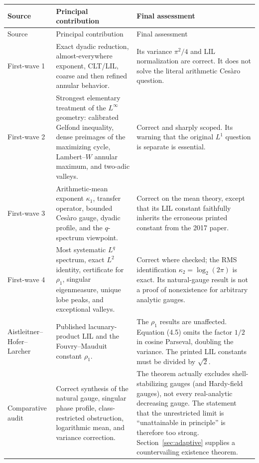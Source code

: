\documentclass[11pt]{article}
\theoremstyle{definition}
\theoremstyle{remark}
\begin{document}
\begin{longtable}{@{}p{}p{}p{}@{}}
\toprule
Source & Principal contribution & Final assessment \\
\midrule
\endfirsthead
\toprule
Source & Principal contribution & Final assessment \\
\midrule
\endhead
First-wave 1 \cite{wave1-1} & Exact dyadic reduction, almost-everywhere exponent, CLT/LIL,
coarse and then refined annular behavior. & Its variance \(\pi^2/4\) and LIL
normalization are correct.  It does not solve the literal arithmetic Ces\`aro
question. \\
\addlinespace
First-wave 2 \cite{wave1-2} & Strongest elementary treatment of the \(L^\infty\) geometry:
calibrated Gelfond inequality, dense preimages of the maximizing cycle,
Lambert--\(W\) annular maximum, and two-adic valleys. & Correct and sharply
scoped.  Its warning that the original \(L^1\) question is separate is
essential. \\
\addlinespace
First-wave 3 \cite{wave1-3} & Arithmetic-mean exponent \(\kappa_1\), transfer operator,
bounded Ces\`aro gauge, dyadic profile, and the \(q\)-spectrum viewpoint. &
Correct on the mean theory, except that its LIL constant faithfully inherits
the erroneous printed constant from the 2017 paper. \\
\addlinespace
First-wave 4 \cite{wave1-4} & Most systematic \(L^q\) spectrum, exact \(L^2\) identity,
certificate for \(\rho_1\), singular eigenmeasure, unique lobe peaks, and
exceptional valleys. & Correct where checked; the RMS identification
\(\kappa_2=\log_2(2\pi)\) is exact.  Its natural-gauge result is not a proof of
nonexistence for arbitrary analytic gauges. \\
\addlinespace
Aistleitner--Hofer--Larcher \cite{ahl2017,ahl-source} & Published lacunary-product LIL and the
Fouvry--Mauduit constant \(\rho_1\). & The \(\rho_1\) results are unaffected.
Equation (4.5) omits the factor \(1/2\) in cosine Parseval, doubling the
variance.  The printed LIL constants must be divided by \(\sqrt2\). \\
\addlinespace
Comparative audit \cite{audit} & Correct synthesis of the natural gauge, singular phase
profile, class-restricted obstruction, logarithmic mean, and variance
correction. & The theorem actually excludes shell-stabilizing gauges (and
Hardy-field gauges), not every real-analytic decreasing gauge.  The statement
that the unrestricted limit is ``unattainable in principle'' is therefore too
strong.  Section~\ref{sec:adaptive} supplies a countervailing existence theorem. \\
\bottomrule
\end{longtable}
\end{document}
